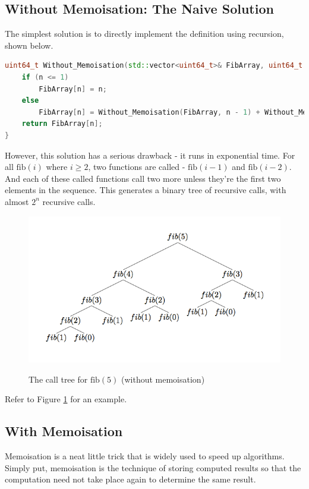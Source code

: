 \documentclass[12pt, a4paper]{article}
\theoremstyle{definition}
\theoremstyle{remark}
\begin{document}
\subsection{Without Memoisation: The Naive Solution}
The simplest solution is to directly implement the definition using recursion, shown below.
\begin{lstlisting}[language=C++]
uint64_t Without_Memoisation(std::vector<uint64_t>& FibArray, uint64_t n) {
    if (n <= 1)
        FibArray[n] = n;
    else
        FibArray[n] = Without_Memoisation(FibArray, n - 1) + Without_Memoisation(FibArray, n - 2);
    return FibArray[n];
}
\end{lstlisting}
% 
However, this solution has a serious drawback - it runs in exponential time. For all $\text{fib}(i)$ where $i \geq 2$, two functions are called - $\text{fib}(i-1)$ and $\text{fib}(i-2)$. And each of these called functions call two more unless they're the first two elements in the sequence. This generates a binary tree of recursive calls, with almost $2^n$ recursive calls.

\begin{figure}[!h]
    \centering
    \includegraphics[scale=0.9]{img/Fibonacci - Call Tree.png}
    \label{fig:fib_calltree}
    \caption{The call tree for $\text{fib}(5)$ (without memoisation)}
\end{figure}

Refer to Figure \ref{fig:fib_calltree} for an example.

\subsection{With Memoisation}
Memoisation is a neat little trick that is widely used to speed up algorithms. Simply put, memoisation is the technique of storing computed results so that the computation need not take place again to determine the same result.
\end{document}
